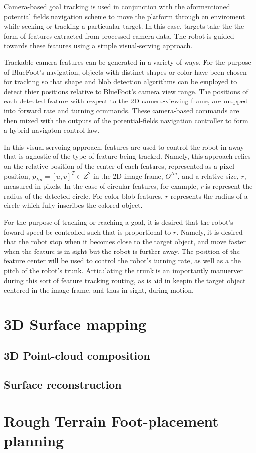 		Camera-based goal tracking is used in conjunction with the aformentioned potential fields navigation scheme to move the platform through an enviroment while seeking or tracking a particualar target. In this case, targets take the the form of features extracted from processed camera data. The robot is guided towards these features using a simple visual-serving approach. 

Trackable camera features can be generated in a variety of ways. For the purpose of BlueFoot's navigation, objects with distinct shapes or color have been chosen for tracking so that shape and blob detection algorithms can be employed to detect thier positions relative to BlueFoot's camera view range. The positions of each detected feature with respect to the 2D camera-viewing frame, are mapped into forward rate and turning commands. These camera-based commands are then mixed with the outputs of the potential-fields navigation controller to form a hybrid navigaton control law.

In this visual-servoing approach, features are used to control the robot in away that is agnostic of the type of feature being tracked. Namely, this approach relies on the relative position of the center of each features, represented as a pixel-position, $p_{Im} = [u,v]^{T} \in Z^{2}$ in the 2D image frame, $O^{Im}$, and a relative size, $r$, measured in pixels. In the case of circular features, for example, $r$ is represent the radius of the detected circle. For color-blob features, $r$ represents the radius of a circle which fully inscribes the colored object. 

For the purpose of tracking or reaching a goal, it is desired that the robot's foward speed be controlled such that is proportional to $r$. Namely, it is desired that the robot stop when it becomes close to the target object, and move faster when the feature is in sight but the robot is further away. The position of the feature center will be used to control the robot's turning rate, as well as a the pitch of the robot's trunk. Articulating the trunk is an importantly manuerver during this sort of feature tracking routing, as is aid in keepin the target object centered in the image frame, and thus in sight, during motion.
	\section{3D Surface mapping}


		\subsection{3D Point-cloud composition}


		\subsection{Surface reconstruction}



	\section{Rough Terrain Foot-placement planning}


